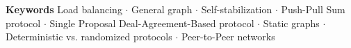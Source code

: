 \textbf{Keywords} Load balancing $\cdot$ General graph $\cdot$ Self-stabilization $\cdot$ Push-Pull Sum protocol $\cdot$ Single Proposal Deal-Agreement-Based protocol $\cdot$ Static graphs $\cdot$ Deterministic vs. randomized protocols $\cdot$ Peer-to-Peer networks

\renewcommand{\clearpage}{}